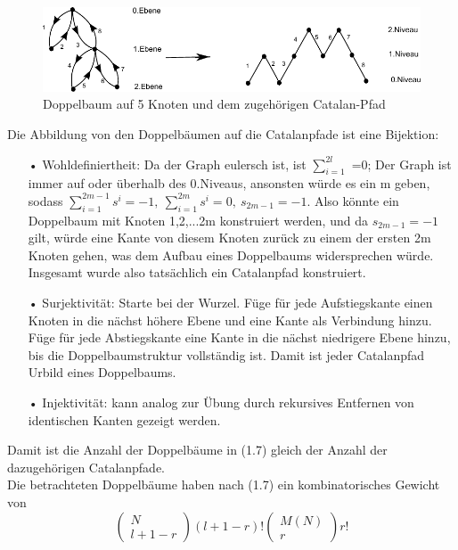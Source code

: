 \documentclass[a4paper, 11pt]{scrreprt}
\newcommand{\student}[1]{\marginnote{{\normalfont\bf #1}}}
\begin{document}
\begin{figure}[htpb]
	\centering
	\includegraphics[width=1.00\textwidth]{Catalan-Pfad.pdf}
	\caption{Doppelbaum auf 5 Knoten und dem zugehörigen Catalan-Pfad} 
\end{figure}

\student{Manuela}
Die Abbildung von den Doppelbäumen auf die Catalanpfade ist eine Bijektion:
\begin{itemize}
 \item[•]Wohldefiniertheit: Da der Graph eulersch ist, ist $ \sum_{i=1}^{2l} $ =0; Der Graph ist immer auf oder überhalb des 0.Niveaus, ansonsten würde es ein m geben, sodass $ \sum_{i=1}^{2m-1}s^{i}=-1, ~\sum_{i=1}^{2m}s^{i}=0, ~ s_{2m-1}=-1  $. Also könnte ein Doppelbaum mit Knoten {1,2,...2m} konstruiert werden, und da $ s_{2m-1}=-1  $ gilt, würde eine Kante von diesem Knoten zurück zu einem der ersten 2m Knoten gehen, was dem Aufbau eines Doppelbaums widersprechen würde. Insgesamt wurde also tatsächlich ein Catalanpfad konstruiert. 
 \item[•] Surjektivität: Starte bei der Wurzel. Füge für jede Aufstiegskante einen Knoten in die nächst höhere Ebene und eine Kante als Verbindung hinzu. Füge für jede Abstiegskante eine Kante in die nächst niedrigere Ebene hinzu, bis die Doppelbaumstruktur vollständig ist. Damit ist jeder Catalanpfad Urbild eines Doppelbaums. 
\item[•] Injektivität: kann analog zur Übung durch rekursives Entfernen von identischen Kanten gezeigt werden.\\
\end{itemize}
Damit ist die Anzahl der Doppelbäume in (1.7) gleich der Anzahl der dazugehörigen Catalanpfade.\\
\student{Andreas}
Die betrachteten Doppelbäume haben nach (1.7) ein kombinatorisches Gewicht von 
	\begin{equation}
		\begin{pmatrix} N\\ l+1-r\end{pmatrix} (l+1-r)! \begin{pmatrix} M(N)\\r\end{pmatrix} r!
	\end{equation}
\end{document}
